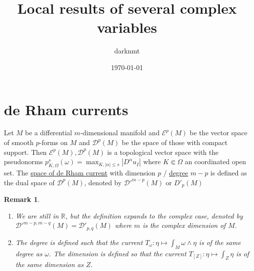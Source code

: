 \documentclass[11pt]{article}
\author{darknmt}
\date{\today}
\title{Local results of several complex variables}
\newtheorem{remark}{Remark}
\begin{document}
\maketitle
\tableofcontents

\iffalse
\begin{info}
The PDF version of this page can be downloaded by replacing \texttt{html} in the its address by
\texttt{pdf}. 
For example \texttt{/html/sheaf-cohomology.html} should become \texttt{/pdf/sheaf-cohomology.pdf}.
\end{info}
\fi


\section{de Rham currents}
\label{sec:org5130693}

Let \(M\) be a differential \(m\)-dimensional manifold and \(\mathcal{E}^p(M)\) be
the vector space of smooth \(p\)-forms on \(M\) and \(\mathcal{D}^p(M)\) be the
space of those with compact support. Then \(\mathcal{E}^p(M), \mathcal{D}^p(M)\) is a topological vector
space with the pseudonorms \(p_{K,\Omega}^s(\omega) = \max_{K, |\alpha|\leq s}|D^\alpha
  u_I|\) where \(K\Subset \Omega\) an coordinated open set. The \uline{space of de Rham
current} with dimension \(p\) / \uline{degree} \(m - p\) is defined as the dual space of
\(\mathcal{D}^p(M)\), denoted by \(\mathcal{D}'^{m-p}(M)\) or \(D'_{p}(M)\)

\begin{remark}
\begin{enumerate}
\item We are still in \(\mathbb{R}\), but the definition expands to the complex case,
denoted by \(\mathcal{D}'^{m-p, m-q}(M) = \mathcal{D}'_{p,q}(M)\) where \(m\) is
the complex dimension of \(M\).
\item The degree is defined such that the current \(T_\omega: \eta \mapsto \int_M
   \omega\wedge\eta\) is of the same degree as \(\omega\). The dimension is defined so
that the current \(T_{[Z]}: \eta \mapsto \int_Z \eta\) is of the same dimension as \(Z\).
\end{enumerate}
\end{remark}
\end{document}
